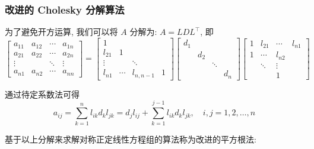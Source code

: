\documentclass[notheorems,serif]{beamer}
\begin{document}
\begin{frame}
\frametitle{改进的 Cholesky 分解算法}
为了避免开方运算, 我们可以将 $A$ 分解为: $A = LDL^{\top}$, 即
\begin{equation}
\left[\begin{array}{cccc}{a_{11}} & {a_{12}} & {\cdots} & {a_{1 n}} \\ {a_{21}} & {a_{22}} & {\cdots} & {a_{2 n}} \\ {\vdots} & {} & {\ddots} & {\vdots} \\ {a_{n 1}} & {a_{n 2}} & {\cdots} & {a_{n n}}\end{array}\right]=\left[\begin{array}{cccc}{1} & {} & {} & {} \\ {l_{21}} & {1} & {} & {} \\ {\vdots} & {} & {\ddots} & {} \\ {l_{n 1}} & {\cdots} & {l_{n, n-1}} & {1}\end{array}\right]\left[\begin{array}{cccc}{d_{1}} & {} & {} & {} \\ {} & {d_{2}} & {} & {} \\ {} & {} & {\ddots} & {} \\ {} & {} & {} & {d_{n}}\end{array}\right]\left[\begin{array}{cccc}{1} & {l_{21}} & {\cdots} & {l_{n 1}} \\ {1} & {\cdots} & {l_{n 2}} \\ {} & {\ddots} & {\vdots} \\ {} & {} & {1}\end{array}\right]
\end{equation}

通过待定系数法可得
\begin{equation}
a_{i j}=\sum_{k=1}^{n} l_{i k} d_{k} l_{j k}=d_{j} l_{i j}+\sum_{k=1}^{j-1} l_{i k} d_{k} l_{j k}, \quad i, j=1,2, \ldots, n
\end{equation}

基于以上分解来求解对称正定线性方程组的算法称为改进的平方根法:
\end{frame}
\end{document}
